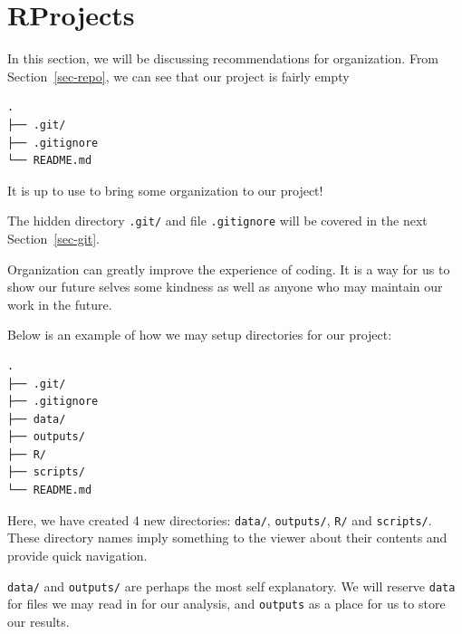 \documentclass[
  letterpaper,
  DIV=11,
  numbers=noendperiod]{scrreprt}
\begin{document}
\hypertarget{rprojects}{%
\section{RProjects}\label{rprojects}}

In this section, we will be discussing recommendations for organization.
From Section~\ref{sec-repo}, we can see that our project is fairly empty

\begin{verbatim}
.
├── .git/
├── .gitignore
└── README.md
\end{verbatim}

It is up to use to bring some organization to our project!

\begin{tcolorbox}[enhanced jigsaw, left=2mm, colframe=quarto-callout-note-color-frame, leftrule=.75mm, opacitybacktitle=0.6, toptitle=1mm, title=\textcolor{quarto-callout-note-color}{\faInfo}\hspace{0.5em}{Note}, opacityback=0, coltitle=black, colbacktitle=quarto-callout-note-color!10!white, breakable, colback=white, titlerule=0mm, bottomrule=.15mm, arc=.35mm, bottomtitle=1mm, rightrule=.15mm, toprule=.15mm]

The hidden directory \texttt{.git/} and file \texttt{.gitignore} will be
covered in the next Section~\ref{sec-git}.

\end{tcolorbox}

Organization can greatly improve the experience of coding. It is a way
for us to show our future selves some kindness as well as anyone who may
maintain our work in the future.

Below is an example of how we may setup directories for our project:

\begin{verbatim}
.
├── .git/
├── .gitignore
├── data/
├── outputs/
├── R/
├── scripts/
└── README.md
\end{verbatim}

Here, we have created 4 new directories: \texttt{data/},
\texttt{outputs/}, \texttt{R/} and \texttt{scripts/}. These directory
names imply something to the viewer about their contents and provide
quick navigation.

\texttt{data/} and \texttt{outputs/} are perhaps the most self
explanatory. We will reserve \texttt{data} for files we may read in for
our analysis, and \texttt{outputs} as a place for us to store our
results.
\end{document}
